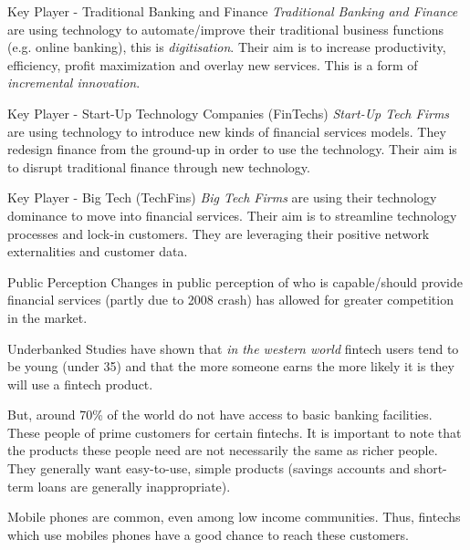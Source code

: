 \documentclass[11pt,a4paper]{article}
\begin{document}
\begin{proposition}{Key Player - Traditional Banking and Finance}
  \textit{Traditional Banking and Finance} are using technology to automate/improve their traditional business functions (e.g. online banking), this is \textit{digitisation}. Their aim is to increase productivity, efficiency, profit maximization and overlay new services. This is a form of \textit{incremental innovation}.
\end{proposition}

\begin{proposition}{Key Player - Start-Up Technology Companies (FinTechs)}
  \textit{Start-Up Tech Firms} are using technology to introduce new kinds of financial services models. They redesign finance from the ground-up in order to use the technology. Their aim is to disrupt traditional finance through new technology.
\end{proposition}

\begin{proposition}{Key Player - Big Tech (TechFins)}
  \textit{Big Tech Firms} are using their technology dominance to move into financial services. Their aim is to streamline technology processes and lock-in customers. They are leveraging their positive network externalities and customer data.
\end{proposition}

\begin{remark}{Public Perception}
  Changes in public perception of who is capable/should provide financial services (partly due to 2008 crash) has allowed for greater competition in the market.
\end{remark}

\begin{remark}{Underbanked}
  Studies have shown that \textit{in the western world} fintech users tend to be young (under 35) and that the more someone earns the more likely it is they will use a fintech product.
  \par But, around 70\% of the world do not have access to basic banking facilities. These people of prime customers for certain fintechs. It is important to note that the products these people need are not necessarily the same as richer people. They generally want easy-to-use, simple products (savings accounts and short-term loans are generally inappropriate).
  \par Mobile phones are common, even among low income communities. Thus, fintechs which use mobiles phones have a good chance to reach these customers.
\end{remark}
\end{document}
